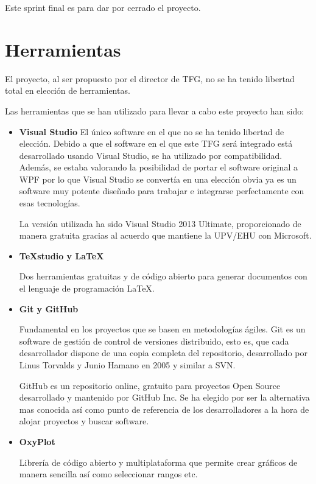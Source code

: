 Este sprint final es para dar por cerrado el proyecto.

\section{Herramientas}
El proyecto, al ser propuesto por el director de TFG, no se ha tenido libertad total en 
elecci\'on de herramientas. 

Las herramientas que se han utilizado para llevar a cabo este proyecto han sido:
\begin{itemize}
    \item 
    \textbf{Visual Studio}
    El \'unico software en el que no se ha tenido libertad de elecci\'on. Debido a que el 
    software en el que este TFG
    ser\'a integrado est\'a desarrollado usando Visual Studio, se ha utilizado por 
    compatibilidad. Adem\'as, se estaba
    valorando la posibilidad de portar el software original a WPF por lo que Visual Studio se 
    convert\'ia en una elecci\'on
    obvia ya es un software muy potente dise\~nado para trabajar e integrarse perfectamente con 
    esas tecnolog\'ias.

    La versi\'on utilizada ha sido Visual Studio 2013 Ultimate, proporcionado de manera gratuita 
    gracias al acuerdo que mantiene 
    la UPV/EHU con Microsoft.
    
    \item 
    \textbf{TeXstudio y \LaTeX}
    
    Dos herramientas gratuitas y de código abierto para generar documentos con el lenguaje de 
    programaci\'on \LaTeX.
    
    \item
    \textbf{Git y GitHub}
    
    Fundamental en los proyectos que se basen en metodologías ágiles. Git es un software de 
    gestión de control de versiones 
    distribuido, esto es, que cada desarrollador dispone de una copia completa del repositorio, 
    desarrollado por Linus Torvalds y 
    Junio Hamano en 2005 y similar a SVN.
    
    GitHub es un repositorio online, gratuito para proyectos Open Source desarrollado y mantenido 
    por GitHub Inc. Se ha elegido
    por ser la alternativa mas conocida as\'i como punto de referencia de los desarrolladores a 
    la hora de alojar proyectos
    y buscar software.
    
    \item
    \textbf{OxyPlot}
    
    Librer\'{i}a de c\'{o}digo abierto y multiplataforma que permite crear gr\'{a}ficos de manera 
    sencilla as\'{i} como seleccionar rangos etc.
    
\end{itemize}

